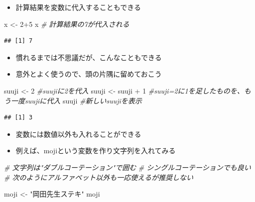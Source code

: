 \documentclass[
]{book}
\newenvironment{Shaded}{\begin{snugshade}}{\end{snugshade}}
\newcommand{\CommentTok}[1]{\textcolor[rgb]{0.56,0.35,0.01}{\textit{#1}}}
\newcommand{\DecValTok}[1]{\textcolor[rgb]{0.00,0.00,0.81}{#1}}
\newcommand{\NormalTok}[1]{#1}
\newcommand{\OtherTok}[1]{\textcolor[rgb]{0.56,0.35,0.01}{#1}}
\newcommand{\SpecialCharTok}[1]{\textcolor[rgb]{0.00,0.00,0.00}{#1}}
\newcommand{\StringTok}[1]{\textcolor[rgb]{0.31,0.60,0.02}{#1}}
\providecommand{\tightlist}{%
  \setlength{\itemsep}{0pt}\setlength{\parskip}{0pt}}
\begin{document}
\begin{itemize}
\tightlist
\item
  計算結果を変数に代入することもできる
\end{itemize}

\begin{Shaded}
\begin{Highlighting}[]
\NormalTok{x }\OtherTok{\textless{}{-}} \DecValTok{2}\SpecialCharTok{+}\DecValTok{5} 
\NormalTok{x }\CommentTok{\# 計算結果の7が代入される}
\end{Highlighting}
\end{Shaded}

\begin{verbatim}
## [1] 7
\end{verbatim}

\begin{itemize}
\tightlist
\item
  慣れるまでは不思議だが、こんなこともできる
\item
  意外とよく使うので、頭の片隅に留めておこう
\end{itemize}

\begin{Shaded}
\begin{Highlighting}[]
\NormalTok{suuji }\OtherTok{\textless{}{-}} \DecValTok{2} \CommentTok{\#suujiに2を代入}
\NormalTok{suuji }\OtherTok{\textless{}{-}}\NormalTok{ suuji }\SpecialCharTok{+} \DecValTok{1} \CommentTok{\#suuji=2に1を足したものを、もう一度suujiに代入}
\NormalTok{suuji }\CommentTok{\#新しいsuujiを表示}
\end{Highlighting}
\end{Shaded}

\begin{verbatim}
## [1] 3
\end{verbatim}

\begin{itemize}
\tightlist
\item
  変数には数値以外も入れることができる
\item
  例えば、mojiという変数を作り文字列を入れてみる
\end{itemize}

\begin{Shaded}
\begin{Highlighting}[]
\CommentTok{\# 文字列は"ダブルコーテーション"で囲む}
\CommentTok{\# \textquotesingle{}シングルコーテーション\textquotesingle{}でも良い}
\CommentTok{\# 次のようにアルファベット以外も一応使えるが推奨しない}

\NormalTok{moji }\OtherTok{\textless{}{-}} \StringTok{"岡田先生ステキ"}
\NormalTok{moji}
\end{Highlighting}
\end{Shaded}
\end{document}
